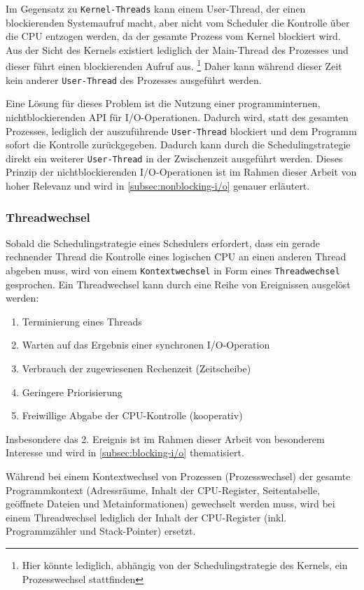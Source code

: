 Im Gegensatz zu \verb|Kernel-Threads| kann einem User-Thread, der einen blockierenden Systemaufruf macht, aber nicht vom Scheduler die Kontrolle über die CPU
entzogen werden, da der gesamte Prozess vom Kernel blockiert wird. Aus der Sicht des Kernels existiert lediglich der Main-Thread des Prozesses und dieser
führt einen blockierenden Aufruf aus. \footnote{Hier könnte lediglich, abhängig von der Schedulingstrategie des Kernels, ein Prozesswechsel stattfinden}
Daher kann während dieser Zeit kein anderer \verb|User-Thread| des Prozesses ausgeführt werden.

Eine Lösung für dieses Problem ist die Nutzung einer programminternen, nichtblockierenden API für I/O-Operationen.
Dadurch wird, statt des gesamten Prozesses, lediglich der auszuführende \verb|User-Thread| blockiert und dem Programm sofort
die Kontrolle zurückgegeben. Dadurch kann durch die Schedulingstrategie direkt ein weiterer \verb|User-Thread| in der Zwischenzeit ausgeführt werden.
\parencite[Kapitel 2.2.4]{Tanenbaum2016}
Dieses Prinzip der nichtblockierenden I/O-Operationen ist im Rahmen dieser Arbeit von hoher Relevanz und wird in \ref{subsec:nonblocking-i/o}
genauer erläutert.

\subsubsection{Threadwechsel}
\label{subsubsec:threadwechsel}
Sobald die Schedulingstrategie eines Schedulers erfordert, dass ein gerade rechnender Thread die Kontrolle eines logischen CPU an
einen anderen Thread abgeben muss, wird von einem \verb|Kontextwechsel| in Form eines \verb|Threadwechsel| gesprochen.
Ein Threadwechsel kann durch eine Reihe von Ereignissen ausgelöst werden:
\begin{enumerate}
	\item Terminierung eines Threads
	\item Warten auf das Ergebnis einer synchronen I/O-Operation
	\item Verbrauch der zugewiesenen Rechenzeit (Zeitscheibe)
	\item Geringere Priorisierung
	\item Freiwillige Abgabe der CPU-Kontrolle (kooperativ)
\end{enumerate}

Insbesondere das 2. Ereignis ist im Rahmen dieser Arbeit von besonderem Interesse und wird in \ref{subsec:blocking-i/o} thematisiert.

Während bei einem Kontextwechsel von Prozessen (Prozesswechsel) der gesamte Programmkontext (Adressräume, Inhalt der CPU-Register,
Seitentabelle, geöffnete Dateien und Metainformationen)
gewechselt werden muss, wird bei einem Threadwechsel lediglich der Inhalt der CPU-Register (inkl. Programmzähler und Stack-Pointer)
ersetzt.\parencite{Mosberger2002}

